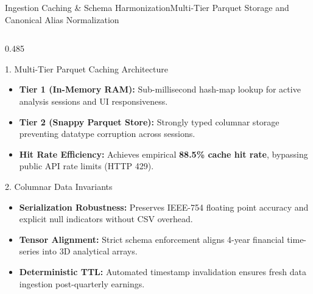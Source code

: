 \begin{frame}{Ingestion Caching \& Schema Harmonization}{Multi-Tier Parquet Storage and Canonical Alias Normalization}
    \vspace{-0.20cm}
    \begin{columns}[T,onlytextwidth]
        \begin{column}{0.485\textwidth}
            \begin{quantcard}[height=2.74cm]{1. Multi-Tier Parquet Caching Architecture}
                \fontsize{5.8pt}{7.0pt}\selectfont
                \begin{itemize}
                    \setlength{\itemsep}{1.2pt}
                    \item \textbf{Tier 1 (In-Memory RAM):} Sub-millisecond hash-map lookup for active analysis sessions and UI responsiveness.
                    \item \textbf{Tier 2 (Snappy Parquet Store):} Strongly typed columnar storage preventing datatype corruption across sessions.
                    \item \textbf{Hit Rate Efficiency:} Achieves empirical \textbf{88.5\% cache hit rate}, bypassing public API rate limits (HTTP 429).
                \end{itemize}
            \end{quantcard}

            \vspace{0.12cm}

            \begin{quantcard}[height=2.74cm]{2. Columnar Data Invariants}
                \fontsize{5.8pt}{7.0pt}\selectfont
                \begin{itemize}
                    \setlength{\itemsep}{1.2pt}
                    \item \textbf{Serialization Robustness:} Preserves IEEE-754 floating point accuracy and explicit null indicators without CSV overhead.
                    \item \textbf{Tensor Alignment:} Strict schema enforcement aligns 4-year financial time-series into 3D analytical arrays.
                    \item \textbf{Deterministic TTL:} Automated timestamp invalidation ensures fresh data ingestion post-quarterly earnings.
                \end{itemize}
            \end{quantcard}
        \end{column}


\end{columns}
\end{frame}

